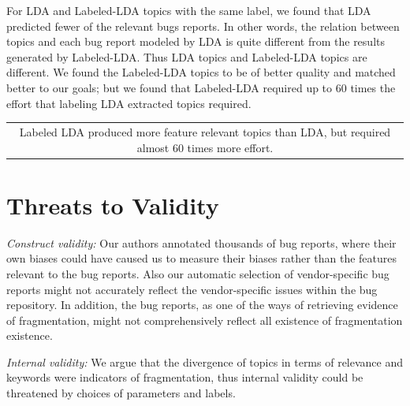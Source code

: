 \documentclass[10pt, conference, compsocconf]{IEEEtran}
\begin{document}

For LDA and Labeled-LDA topics with the same label, we found that LDA
predicted fewer of the relevant bugs reports.
In other words, the relation between topics and each bug
report modeled by LDA is quite different from the results generated by
Labeled-LDA. 
Thus LDA topics and Labeled-LDA topics are different. We found the
Labeled-LDA topics to be of better quality and matched better to our
goals; but we found that Labeled-LDA required up to 60
times the effort that labeling LDA extracted topics required.

\vspace*{0.5em}
\begin{tabular}{|c|}
\hline 
\parbox{3.0in}{\centering Labeled LDA produced more feature relevant
  topics than LDA, but required almost 60 times more effort.}
\\
\hline
\end{tabular}



\section{Threats to Validity}
\label{sec:threats}

\textit{Construct validity:}  
Our authors annotated thousands of bug reports, where their own biases could
have caused us to measure their biases rather than the features
relevant to the bug reports.
Also our automatic selection of vendor-specific bug reports
might not accurately reflect the vendor-specific issues within the
bug repository.
In addition, the bug reports, as one of the ways of retrieving evidence of fragmentation, 
might not comprehensively reflect all existence of fragmentation existence.


\textit{Internal validity:}  We argue that the divergence of topics in
terms of relevance and keywords were indicators of fragmentation, thus
internal validity could be threatened by choices of parameters and labels.
\end{document}
